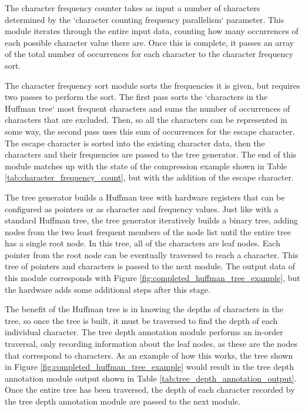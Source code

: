 \documentclass[doublespace,nopageskip]{VTthesis}
\begin{document}
The character frequency counter takes as input a number of characters determined by the `character counting frequency parallelism` parameter. This module iterates through the entire input data, counting how many occurrences of each possible character value there are. Once this is complete, it passes an array of the total number of occurrences for each character to the character frequency sort.

The character frequency sort module sorts the frequencies it is given, but requires two passes to perform the sort. The first pass sorts the `characters in the Huffman tree` most frequent characters and sums the number of occurrences of characters that are excluded. Then, so all the characters can be represented in some way, the second pass uses this sum of occurrences for the escape character. The escape character is sorted into the existing character data, then the characters and their frequencies are passed to the tree generator. The end of this module matches up with the state of the compression example shown in Table \ref{tab:character_frequency_count}, but with the addition of the escape character. 

The tree generator builds a Huffman tree with hardware registers that can be configured as pointers or as character and frequency values. Just like with a standard Huffman tree, the tree generator iteratively builds a binary tree, adding nodes from the two least frequent members of the node list until the entire tree has a single root node. In this tree, all of the characters are leaf nodes. Each pointer from the root node can be eventually traversed  to reach a character. This tree of pointers and characters is passed to the next module. The output data of this module corresponds with Figure \ref{fig:completed_huffman_tree_example}, but the hardware adds some additional steps after this stage.

The benefit of the Huffman tree is in knowing the depths of characters in the tree, so once the tree is built, it must be traversed to find the depth of each individual character. The tree depth annotation module performs an in-order traversal, only recording information about the leaf nodes, as these are the nodes that correspond to characters. As an example of how this works, the tree shown in Figure \ref{fig:completed_huffman_tree_example} would result in the tree depth annotation module output shown in Table \ref{tab:tree_depth_annotation_output}. Once the entire tree has been traversed, the depth of each character recorded by the tree depth annotation module are passed to the next module.
\end{document}

